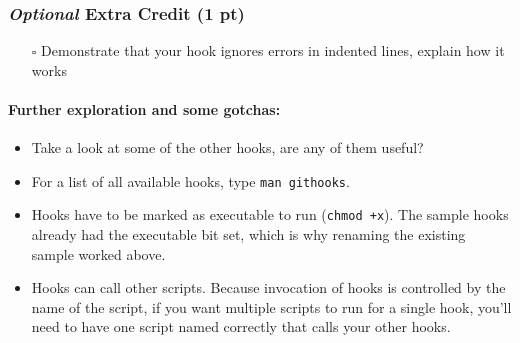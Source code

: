 \documentclass{article}
\begin{document}
\subsubsection*{\emph{Optional} Extra Credit (1 pt)}
\begin{itemize}
  \item[$\square$] Demonstrate that your hook ignores errors in indented
    lines, explain how it works
\end{itemize}


\paragraph{Further exploration and some gotchas:}
\begin{itemize}
  \item Take a look at some of the other hooks, are any of them useful?
  \item For a list of all available hooks, type \texttt{man githooks}.
  \item Hooks have to be marked as executable to run (\texttt{chmod +x}). The
    sample hooks already had the executable bit set, which is why renaming the
    existing sample worked above.
  \item Hooks can call other scripts. Because invocation of hooks is
    controlled by the name of the script, if you want multiple scripts to run
    for a single hook, you'll need to have one script named correctly that
    calls your other hooks.
\end{itemize}
\end{document}
